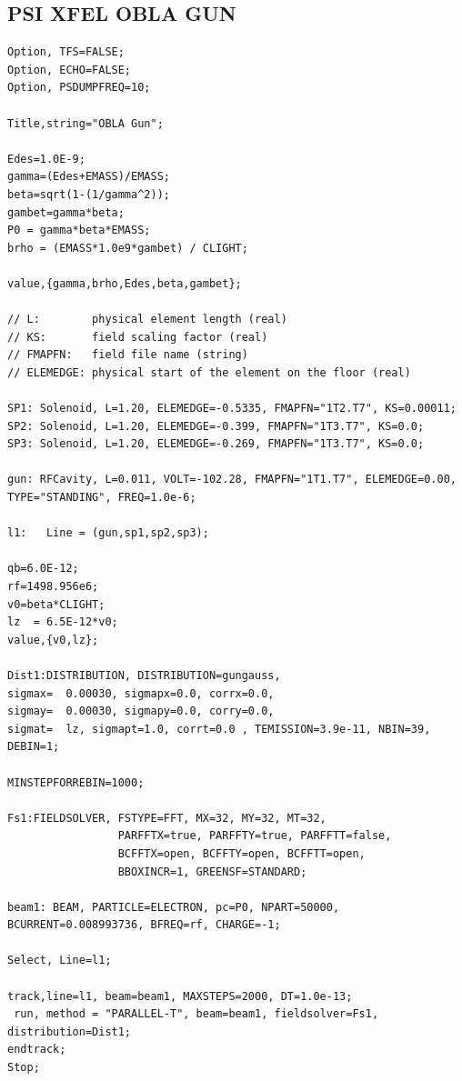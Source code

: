 \subsection{PSI XFEL OBLA GUN}
\label{sec:oblagun}

\begin{footnotesize}
\begin{verbatim} 
Option, TFS=FALSE;
Option, ECHO=FALSE;
Option, PSDUMPFREQ=10;

Title,string="OBLA Gun";

Edes=1.0E-9;
gamma=(Edes+EMASS)/EMASS;
beta=sqrt(1-(1/gamma^2));
gambet=gamma*beta;
P0 = gamma*beta*EMASS;
brho = (EMASS*1.0e9*gambet) / CLIGHT;

value,{gamma,brho,Edes,beta,gambet};

// L:        physical element length (real)
// KS:       field scaling factor (real)
// FMAPFN:   field file name (string)
// ELEMEDGE: physical start of the element on the floor (real)

SP1: Solenoid, L=1.20, ELEMEDGE=-0.5335, FMAPFN="1T2.T7", KS=0.00011;
SP2: Solenoid, L=1.20, ELEMEDGE=-0.399, FMAPFN="1T3.T7", KS=0.0;
SP3: Solenoid, L=1.20, ELEMEDGE=-0.269, FMAPFN="1T3.T7", KS=0.0;

gun: RFCavity, L=0.011, VOLT=-102.28, FMAPFN="1T1.T7", ELEMEDGE=0.00, TYPE="STANDING", FREQ=1.0e-6;

l1:   Line = (gun,sp1,sp2,sp3); 

qb=6.0E-12;
rf=1498.956e6;  
v0=beta*CLIGHT;
lz  = 6.5E-12*v0;
value,{v0,lz};

Dist1:DISTRIBUTION, DISTRIBUTION=gungauss,
sigmax=  0.00030, sigmapx=0.0, corrx=0.0,
sigmay=  0.00030, sigmapy=0.0, corry=0.0,
sigmat=  lz, sigmapt=1.0, corrt=0.0 , TEMISSION=3.9e-11, NBIN=39, DEBIN=1;

MINSTEPFORREBIN=1000;

Fs1:FIELDSOLVER, FSTYPE=FFT, MX=32, MY=32, MT=32, 
                 PARFFTX=true, PARFFTY=true, PARFFTT=false,
                 BCFFTX=open, BCFFTY=open, BCFFTT=open, 
                 BBOXINCR=1, GREENSF=STANDARD;

beam1: BEAM, PARTICLE=ELECTRON, pc=P0, NPART=50000, BCURRENT=0.008993736, BFREQ=rf, CHARGE=-1;

Select, Line=l1;

track,line=l1, beam=beam1, MAXSTEPS=2000, DT=1.0e-13;
 run, method = "PARALLEL-T", beam=beam1, fieldsolver=Fs1, distribution=Dist1;
endtrack;
Stop;
\end{verbatim}
\end{footnotesize}

